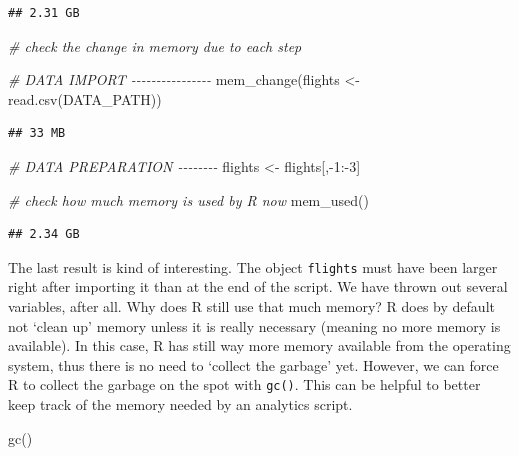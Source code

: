 \documentclass[
  12pt,
]{style/krantz}
\newenvironment{Shaded}{\begin{snugshade}}{\end{snugshade}}
\newcommand{\CommentTok}[1]{\textcolor[rgb]{0.56,0.35,0.01}{\textit{#1}}}
\newcommand{\DecValTok}[1]{\textcolor[rgb]{0.00,0.00,0.81}{#1}}
\newcommand{\FunctionTok}[1]{\textcolor[rgb]{0.00,0.00,0.00}{#1}}
\newcommand{\NormalTok}[1]{#1}
\newcommand{\OtherTok}[1]{\textcolor[rgb]{0.56,0.35,0.01}{#1}}
\newcommand{\SpecialCharTok}[1]{\textcolor[rgb]{0.00,0.00,0.00}{#1}}
\begin{document}
\begin{verbatim}
## 2.31 GB
\end{verbatim}

\begin{Shaded}
\begin{Highlighting}[]
\CommentTok{\# check the change in memory due to each step}

\CommentTok{\# DATA IMPORT {-}{-}{-}{-}{-}{-}{-}{-}{-}{-}{-}{-}{-}{-}{-}{-}}
\FunctionTok{mem\_change}\NormalTok{(flights }\OtherTok{\textless{}{-}} \FunctionTok{read.csv}\NormalTok{(DATA\_PATH))}
\end{Highlighting}
\end{Shaded}

\begin{verbatim}
## 33 MB
\end{verbatim}

\begin{Shaded}
\begin{Highlighting}[]
\CommentTok{\# DATA PREPARATION {-}{-}{-}{-}{-}{-}{-}{-}}
\NormalTok{flights }\OtherTok{\textless{}{-}}\NormalTok{ flights[,}\SpecialCharTok{{-}}\DecValTok{1}\SpecialCharTok{:{-}}\DecValTok{3}\NormalTok{]}

\CommentTok{\# check how much memory is used by R now}
\FunctionTok{mem\_used}\NormalTok{()}
\end{Highlighting}
\end{Shaded}

\begin{verbatim}
## 2.34 GB
\end{verbatim}

The last result is kind of interesting. The object \texttt{flights} must have been larger right after importing it than at the end of the script. We have thrown out several variables, after all. Why does R still use that much memory? R does by default not `clean up' memory unless it is really necessary (meaning no more memory is available). In this case, R has still way more memory available from the operating system, thus there is no need to `collect the garbage' yet. However, we can force R to collect the garbage on the spot with \texttt{gc()}. This can be helpful to better keep track of the memory needed by an analytics script.

\begin{Shaded}
\begin{Highlighting}[]
\FunctionTok{gc}\NormalTok{()}
\end{Highlighting}
\end{Shaded}
\end{document}
